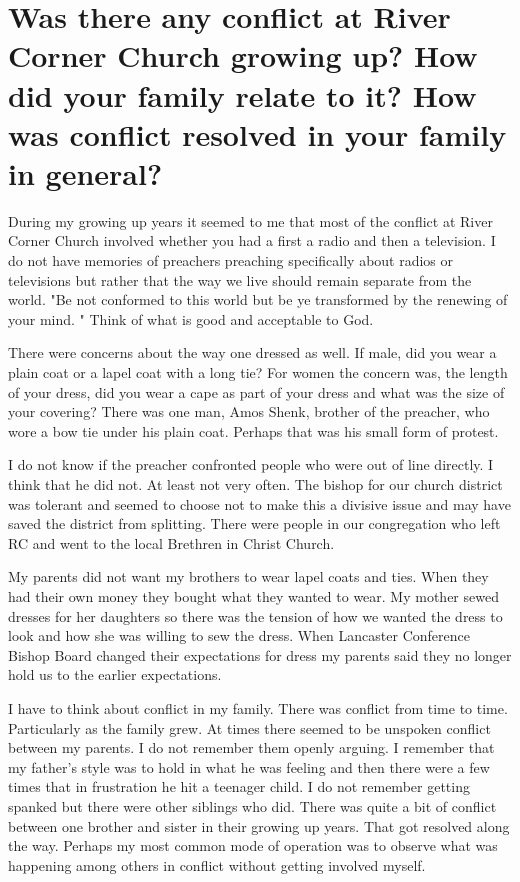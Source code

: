\section{Was there any conflict at River Corner Church growing up? How did your family relate to it? How was conflict resolved in your family in general?}
During my growing up years it seemed to me that most of the conflict at River Corner Church involved whether you had a first a radio and then a television.
I do not have memories of preachers preaching specifically about radios or televisions but rather that the way we live should remain separate from the world.
"Be not conformed to this world but be ye transformed by the renewing of your mind.
" Think of what is good and acceptable to God.

There were concerns about the way one dressed as well.
If male, did you wear a plain coat or a lapel coat with a long tie? For women the concern was, the length of your dress, did you wear a cape as part of your dress and what was the size of your covering?
There was one man, Amos Shenk, brother of the preacher, who wore a bow tie under his plain coat.
Perhaps that was his small form of protest.

I do not know if the preacher confronted people who were out of line directly.
I think that he did not.
At least not very often.
The bishop for our church district was tolerant and seemed to choose not to make this a divisive issue and may have saved the district from splitting.
There were people in our congregation who left RC and went to the local Brethren in Christ Church.

My parents did not want my brothers to wear lapel coats and ties.
When they had their own money they bought what they wanted to wear.
My mother sewed dresses for her daughters so there was the tension of how we wanted the dress to look and how she was willing to sew the dress.
When Lancaster Conference Bishop Board changed their expectations for dress my parents said they no longer hold us to the earlier expectations.

I have to think about conflict in my family.
There was conflict from time to time.
Particularly as the family grew.
At times there seemed to be unspoken conflict between my parents.
I do not remember them openly arguing.
I remember that my father's style was to hold in what he was feeling and then there were a few times that in frustration he hit a teenager child.
I do not remember getting spanked but there were other siblings who did.
There was quite a bit of conflict between one brother and sister in their growing up years.
That got resolved along the way.
Perhaps my most common mode of operation was to observe what was happening among others in conflict without getting involved myself.






